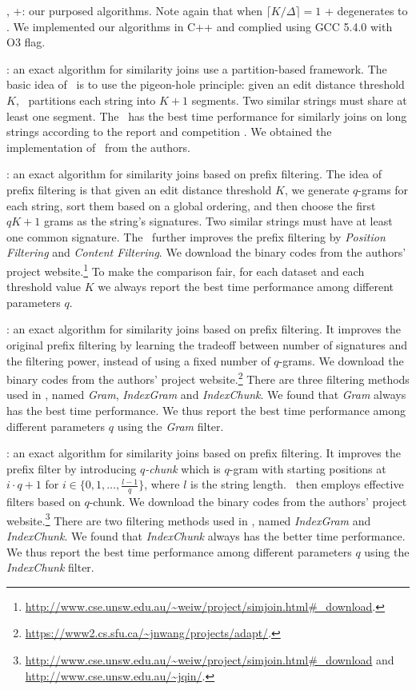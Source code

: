 \medskip
\noindent \ebdjoin, \ebdjoin+: our purposed algorithms.  Note again that when $\lceil K/\Delta \rceil = 1$ \ebdjoin+ degenerates to \ebdjoin.  We implemented our algorithms in C++ and complied using GCC 5.4.0 with O3 flag.

\medskip
\noindent \pass \cite{LDW11}: an exact algorithm for similarity joins use a partition-based framework.  The basic idea of \pass\ is to use the pigeon-hole principle: given an edit distance threshold $K$, \pass\ partitions each string into $K+1$ segments. Two similar strings must share at least one segment.  The \pass\ has the best time performance for similarly joins on long strings according to the report \cite{JLFL14} and competition \cite{WDG14}.   We obtained the implementation of \pass\ from the authors.

\medskip
\noindent \edjoin \cite{XWL08}: an exact algorithm for similarity joins based on prefix filtering.  The idea of prefix filtering is that given an edit distance threshold $K$, we generate $q$-grams for each string, sort them based on a global ordering, and then choose the first $qK+1$ grams as the string's signatures. Two similar strings must have at least one common signature. The \edjoin\ further improves the prefix filtering by {\em Position Filtering} and {\em Content Filtering}. We download the binary codes from the authors' project website.\footnote{\url{http://www.cse.unsw.edu.au/~weiw/project/simjoin.html\#\_download}.} To make the comparison fair, for each dataset and each threshold value $K$ we always report the best time performance among different parameters $q$.

\medskip
\noindent \adpjoin \cite{WLF12}:  an exact algorithm for similarity joins based on prefix filtering.  It improves the original prefix filtering by learning the tradeoff between number of signatures and the  filtering power, instead of using a fixed number of $q$-grams. We download the binary codes from the authors' project website.\footnote{\url{https://www2.cs.sfu.ca/~jnwang/projects/adapt/}.} There are three filtering methods used in \cite{WLF12}, named {\em Gram}, {\em IndexGram} and {\em IndexChunk}. We found that {\em Gram} always has the best time performance. We thus report the best time performance among different parameters $q$ using the {\em Gram} filter.

\medskip
\noindent \qchunk \cite{QWL11}: an exact algorithm for similarity joins based on prefix filtering.  It improves the prefix filter by introducing {\em $q$-chunk} which is $q$-gram with starting positions at $i \cdot q +1$ for $i\in \{0, 1, \ldots, \frac{l-1}{q}\}$, where $l$ is the string length. \qchunk\ then employs effective filters based on $q$-chunk. We download the binary codes from the authors' project website.\footnote{\url{http://www.cse.unsw.edu.au/~weiw/project/simjoin.html\#\_download} and \url{http://www.cse.unsw.edu.au/~jqin/}.} There are two filtering methods used in \cite{QWL11}, named {\em IndexGram} and {\em IndexChunk}. We found that {\em IndexChunk} always has the better time performance. We thus report the best time performance among different parameters $q$ using the {\em IndexChunk} filter.


